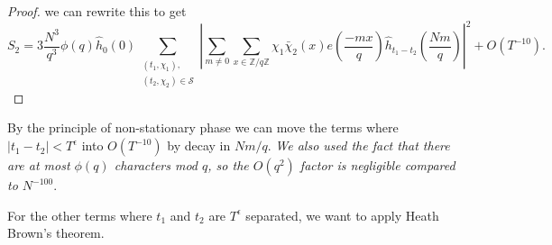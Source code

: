 \begin{proof}
    we can rewrite this to get
    \fi
    \[
        S_2 = 3\frac{N^3}{q^3} \phi(q) \hat{h}_{0}\left(0\right) \sum_{\substack{(t_1,\chi_1),\\(t_2,\chi_2)\in\mathcal{S}}} \left|\sum_{m\neq 0} \sum_{x \in \mathbb{Z}/q\mathbb{Z}}\chi_1\bar{\chi}_2(x) e\left(\frac{-mx}{q}\right)
         \hat{h}_{t_1-t_2}\left(\frac{Nm}{q}\right)\right|^2 + O(T^{-10}).
    \]
\end{proof}

By the principle of non-stationary phase we can move the terms where $|t_1-t_2|<T^\epsilon$ into $O(T^{-10})$ by decay in $Nm/q$. \textit{We also used the fact that there are at most $\phi(q)$ characters mod $q$, so the $O(q^2)$ factor is negligible compared to $N^{-100}$}.

For the other terms where $t_1$ and $t_2$ are $T^\epsilon$ separated, we want to apply Heath Brown's theorem.

